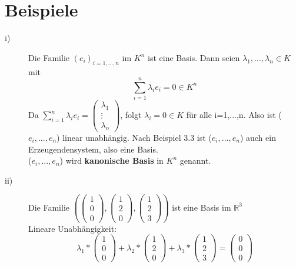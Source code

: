 \documentclass{scrbook}
\begin{document}
\section{Beispiele}
\begin{description}
\item[i)] Die Familie $(e_i)_{i=1,...,n}$ im $K^n$ ist eine Basis. Dann seien $\lambda_1,...,\lambda_n\in K$ mit
\[
\sum^n_{i=1}\lambda_ie_i =0 \in K^n
\]
Da $\sum^n_{i=1}\lambda_ie_i = \left(\begin{array}{c}
\lambda_1\\
\vdots\\
\lambda_n
\end{array}\right)$, folgt $\lambda_i=0\in K$ für alle i=1,...,n. Also ist ($e_i,...,e_n$) linear unabhängig. Nach Beispiel 3.3 ist ($e_i,...,e_n$) auch ein Erzeugendensystem, also eine Basis.\\
($e_i,...,e_n$) wird \textbf{kanonische Basis} in $K^n$ genannt.
\item[ii)] Die Familie $\left(\left(\begin{array}{c}1\\0\\0\end{array}\right),\left(\begin{array}{c}1\\2\\0\end{array}\right),\left(\begin{array}{c}1\\2\\3\end{array}\right)\right)$ ist eine Basis im $\mathbb{R}^3$\\
Lineare Unabhängigkeit:
\[
\lambda_1 * \left(\begin{array}{c}1\\0\\0\end{array}\right) +\lambda_2 *\left(\begin{array}{c}1\\2\\0\end{array}\right)+\lambda_3*\left(\begin{array}{c}1\\2\\3\end{array}\right) = \left(\begin{array}{c}0\\0\\0\end{array}\right)
\]
\end{description}
\end{document}

